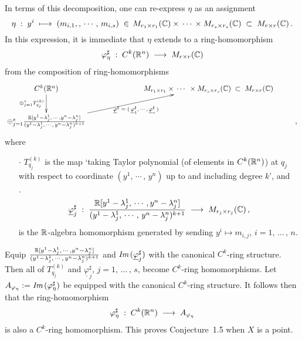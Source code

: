 \documentclass[11pt]{article}
\numberwithin{equation}{subsection}
\newcommand{\Image}{\mbox{\it Im}\,}
\begin{document}
 In terms of this decomposition,
  one can re-express $\eta$ as an assignment
  $$
    \eta\;:\; y^i\; \longmapsto\;
	                  (m_{i, 1},, \,\cdots\,,\, m_{i,s})\;
					  \in\, M_{r_1\times r_1}({\Bbb C})
					                 \times \,\cdots\,\times M_{r_s\times r_s}({\Bbb C})\;
                 \subset\; M_{r\times r}({\Bbb C})\,.									
  $$
 In this expression,
   it is immediate that
   $\eta$ extends to a ring-homomorphism
   $$
     \varphi_{\eta}^{\sharp}\;  :\;
	   C^k({\Bbb R}^n)\; \longrightarrow\; M_{r\times r}({\Bbb C})
   $$
   from the composition of ring-homomorphisms
    $$
	  \xymatrix{
	     C^k({\Bbb R}^n)
	           \ar[d]_-{\oplus_{j=1}^sT_{q_j}^{(k)} }
	       && \hspace{2em}
		         M_{r_1\times r_1}\times \,\cdots\,\;\times M_{r_s\times r_s}({\Bbb C})\;
		           \subset\; M_{r\times r}({\Bbb C})    \\
         \oplus_{j=1}^s
	          \frac{{\Bbb R}[y^1-\lambda_j^1,\,\cdots\,, y^n-\lambda_j^n] }
	                       {(y^1-\lambda_j^1,\,\cdots\,,\, y^n-\lambda_j^n)^{k+1}}
	 	    	\ar[rru]_-{\underline{\varphi}^{\sharp}\;
				                       =\; (\, \underline{\varphi}^{\sharp}_1,\,\cdots\,,\,
        									       \underline{\varphi}^{\sharp}_s\,) }    &&&,
	  }
    $$	
  where
   \begin{itemize}
    \item[\LARGE $\cdot$]
	  $T_{q_j}^{(k)}$ is the map
		 `taking Taylor polynomial (of elements in $C^k({\Bbb R}^n)$) at $q_j$
		      with respect to coordinate $(y^1,\,\cdots\,,\, y^n)$ up to and including degree $k$', and
	
    \item[\LARGE $\cdot$]
      $$
	    \underline{\varphi}^{\sharp}_j\; :\;  		
		  	   \frac{{\Bbb R}[y^1-\lambda_j^1,\,\cdots\,, y^n-\lambda_j^n]}
	                    {(y^1-\lambda_j^1,\,\cdots\,,\, y^n-\lambda_j^n)^{k+1}}\;
          \longrightarrow\; M_{r_j\times r_j}({\Bbb C})\,,							
	  $$ 	
	  is the ${\Bbb R}$-algebra homomorphism generated by sending
	   $y^i\mapsto m_{i,j}$, $i=1,\,\ldots\,,\,n$.
   \end{itemize}

 Equip
    $\frac{{\Bbb R}[y^1-\lambda_j^1,\,\cdots\,, y^n-\lambda_j^n]}
	                    {(y^1-\lambda_j^1,\,\cdots\,,\, y^n-\lambda_j^n)^{k+1}}$   and
    $\Image(\underline{\varphi}^{\sharp}_j)$						
 with the canonical $C^k$-ring structure.
 Then all of
    $T_{q_j}^{(k)}$  and
	$\underline{\varphi}^{\sharp}_j$, $j=1,\,\ldots\,,\,s$,
  become $C^k$-ring homomorphisms.	
 Let $A_{\varphi_{\eta}}:= \Image (\varphi_{\eta}^{\sharp})$
   be equipped with the canonical $C^k$-ring structure.
 It follows then that
  the ring-homomorphism
  $$
     \varphi^{\sharp}_{\eta}\;:\;
	   C^k({\Bbb R}^n)\; \longrightarrow\; A_{\varphi_{\eta}}
  $$
 is also a $C^k$-ring homomorphism.
 This proves Conjecture~1.5 when $X$ is a point.
\end{document}
